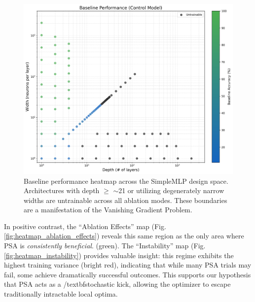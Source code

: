 \documentclass[conference]{IEEEtran}
\begin{document}
\begin{figure}[ht]
\centering
\includegraphics[width=\linewidth]{SimpleMLP_Heatmap_Baseline_Performance.png}
\caption{Baseline performance heatmap across the SimpleMLP design space. Architectures with depth $\geq$ $\sim$21 or utilizing degenerately narrow widths are untrainable across all ablation modes. These boundaries are a manifestation of the Vanishing Gradient Problem.}
\label{fig:heatmap_baseline}
\end{figure}

In positive contrast, the ``Ablation Effects'' map (Fig. \ref{fig:heatmap_ablation_effects}) reveals this same region as the only area where PSA is \textit{consistently beneficial}. (green). The ``Instability'' map (Fig. \ref{fig:heatmap_instability}) provides valuable insight: this regime exhibits the highest training variance (bright red), indicating that while many PSA trials may fail, some achieve dramatically successful outcomes. This supports our hypothesis that PSA acts as a /textbf{stochastic kick}, allowing the optimizer to escape traditionally intractable local optima.
\end{document}
